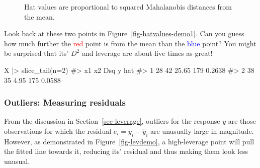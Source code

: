 \documentclass[
  letterpaper,
  10pt,
  krantz2]{krantz}
\makeatletter
\newenvironment{Shaded}{\begin{snugshade}}{\end{snugshade}}
\newcommand{\AttributeTok}[1]{\textcolor[rgb]{0.40,0.45,0.13}{#1}}
\newcommand{\CommentTok}[1]{\textcolor[rgb]{0.37,0.37,0.37}{#1}}
\newcommand{\DecValTok}[1]{\textcolor[rgb]{0.68,0.00,0.00}{#1}}
\newcommand{\FunctionTok}[1]{\textcolor[rgb]{0.28,0.35,0.67}{#1}}
\newcommand{\NormalTok}[1]{\textcolor[rgb]{0.00,0.23,0.31}{#1}}
\newcommand{\SpecialCharTok}[1]{\textcolor[rgb]{0.37,0.37,0.37}{#1}}
\newenvironment{kframe}{%
  \medskip{}
  \setlength{\fboxsep}{.8em}
  \def\at@end@of@kframe{}%
  \ifinner\ifhmode%
  \def\at@end@of@kframe{\end{minipage}}%
  \begin{minipage}{\columnwidth}%
  \fi\fi%
  \def\FrameCommand##1{\hskip\@totalleftmargin \hskip-\fboxsep
  \colorbox{shadecolor}{##1}\hskip-\fboxsep
      \hskip-\linewidth \hskip-\@totalleftmargin \hskip\columnwidth}%
  \MakeFramed {\advance\hsize-\width
    \@totalleftmargin\z@ \linewidth\hsize
    \@setminipage}}%
{\par\unskip\endMakeFramed%
  \at@end@of@kframe}
\renewenvironment{Shaded}{\begin{kframe}}{\end{kframe}}
\makeatother
\begin{document}
\begin{figure}[H]


\caption{\label{fig-hatvalues-demo2}Hat values are proportional to
squared Mahalanobis distances from the mean.}

\end{figure}%

Look back at these two points in Figure~\ref{fig-hatvalues-demo1}. Can
you guess how much further the \textcolor{red}{red} point is from the
mean than the \textcolor{blue}{blue} point? You might be surprised that
its' \(D^2\) and leverage are about five times as great!

\begin{Shaded}
\begin{Highlighting}[]
\NormalTok{X }\SpecialCharTok{|\textgreater{}} \FunctionTok{slice\_tail}\NormalTok{(}\AttributeTok{n=}\DecValTok{2}\NormalTok{)}
\CommentTok{\#\textgreater{}   x1 x2   Dsq   y    hat}
\CommentTok{\#\textgreater{} 1 28 42 25.65 179 0.2638}
\CommentTok{\#\textgreater{} 2 38 35  4.95 175 0.0588}
\end{Highlighting}
\end{Shaded}

\subsubsection{Outliers: Measuring
residuals}\label{outliers-measuring-residuals}

From the discussion in Section~\ref{sec-leverage}, outliers for the
response \(y\) are those observations for which the residual
\(e_i = y_i - \hat{y}_i\) are unusually large in magnitude. However, as
demonstrated in Figure~\ref{fig-levdemo}, a high-leverage point will
pull the fitted line towards it, reducing its' residual and thus making
them look less unusual.
\end{document}
